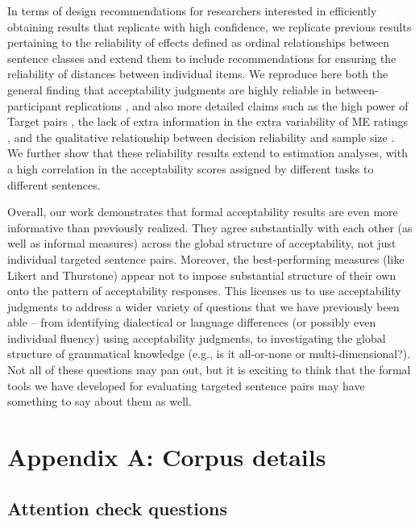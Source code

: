 \documentclass[doc]{apa6}
\newcommand{\targchoice}{{\sc Target pairs}}
\newcommand{\ME}{{\sc ME}}%
\newcommand{\thurstone}{{\sc Thurstone}}
\newcommand{\likert}{{\sc Likert}}
\begin{document}
In terms of design recommendations for researchers interested in efficiently obtaining results that replicate with high confidence, we replicate previous results pertaining to the reliability of effects defined as ordinal relationships between sentence classes and extend them to include recommendations for ensuring the reliability of distances between individual items. We reproduce here both the general finding that acceptability judgments are highly reliable in between-participant replications \citep{sprouse2012revisitingadgerscoresyntax,sprouse2013formalinformal}, and also more detailed claims such as the high power of \targchoice{} \citep{schutze2014judgmentdata,sprousealmeida2017sensitivitypower}, the lack of extra information in the extra variability of \ME{} ratings \citep{weskott2011informativity}, and the qualitative relationship between decision reliability and sample size \citep{mahowald2016snap}.
We further show that these reliability results extend to estimation analyses, with a high correlation in the acceptability scores assigned by different tasks to different sentences.

Overall, our work demonstrates that formal acceptability results are even more informative than previously realized. They agree substantially with each other (as well as informal measures) across the global structure of acceptability, not just individual targeted sentence pairs. Moreover, the best-performing measures (like \likert{} and \thurstone{}) appear not to impose substantial structure of their own onto the pattern of acceptability responses. This licenses us to use acceptability judgments to address a wider variety of questions that we have previously been able -- from identifying dialectical or language differences (or possibly even individual fluency) using acceptability judgments, to investigating the global structure of grammatical knowledge (e.g., is it all-or-none or multi-dimensional?). Not all of these questions may pan out, but it is exciting to think that the formal tools we have developed for evaluating targeted sentence pairs may have something to say about them as well.

\section*{Appendix A: Corpus details}

\subsection*{Attention check questions}
\end{document}
